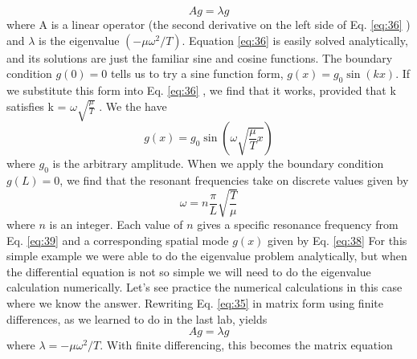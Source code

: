 				\begin{equation}\label{eq:37}
		Ag =\lambda g
				\end{equation}
				where A is a linear operator (the second derivative on the left side of Eq. \ref{eq:36} )
and $\lambda$ is the eigenvalue $(−\mu \omega^2 / T )$.
Equation \ref{eq:36} is easily solved analytically, and its solutions are just the familiar
sine and cosine functions. The boundary condition $g (0) = 0$ tells us to try a sine
function form, $g (x) = g_0 \sin(kx)$. If we substitute this form into Eq. \ref{eq:36} , we find
that it works, provided that k satisfies k = $\omega \sqrt{\frac{\mu}{ T}}$ . We the have
		\begin{equation}\label{eq:38}
		g(x) = g_0\sin(\omega \sqrt{\frac{\mu}{T}x})
				\end{equation}		
				where $g_0$ is the arbitrary amplitude. When we apply the boundary condition
$g(L) = $0, we find that the resonant frequencies take on discrete values given by
\begin{equation}\label{eq:39}
						\omega = n \frac{\pi}{L}\sqrt{\frac{T}{\mu}}
					\end{equation}
				where $n$ is an integer. Each value of $n$ gives a specific resonance frequency from
Eq. \ref{eq:39} and a corresponding spatial mode $g(x)$ given by Eq. \ref{eq:38}
For this simple example we were able to do the eigenvalue problem analytically, but when the differential equation is not so simple we will need to do the
eigenvalue calculation numerically. Let\rq s see practice the numerical calculations
in this case where we know the answer. Rewriting Eq. \ref{eq:35} in matrix form using
finite differences, as we learned to do in the last lab, yields
\begin{equation}\label{eq:310}
		Ag = \lambda g
				\end{equation}
				where $ \lambda = - \mu\omega^2/T$. With finite differencing, this becomes the matrix equation
